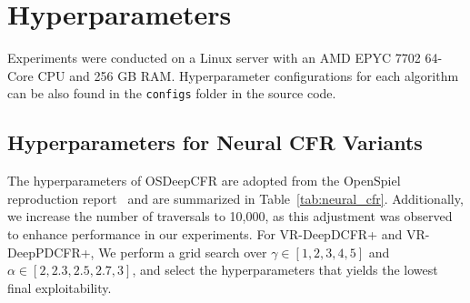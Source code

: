 \documentclass[letterpaper]{article} %
\begin{document}
\section{Hyperparameters}
\label{app:hypers}

Experiments were conducted on a Linux server with an AMD EPYC 7702 64-Core CPU and 256 GB RAM. Hyperparameter conﬁgurations for each algorithm can be also found in the \texttt{configs} folder in the source code. 

\subsection{Hyperparameters for Neural CFR Variants}

The hyperparameters of OSDeepCFR are adopted from the OpenSpiel reproduction report~\cite{walton2021multi} and are summarized in Table~\ref{tab:neural_cfr}. Additionally, we increase the number of traversals to 10,000, as this adjustment was observed to enhance performance in our experiments. For VR-DeepDCFR+ and VR-DeepPDCFR+, We perform a grid search over $\gamma \in [1, 2, 3, 4, 5]$ and $\alpha \in [2, 2.3, 2.5, 2.7, 3]$, and select the hyperparameters that yields the lowest final exploitability.
\end{document}
